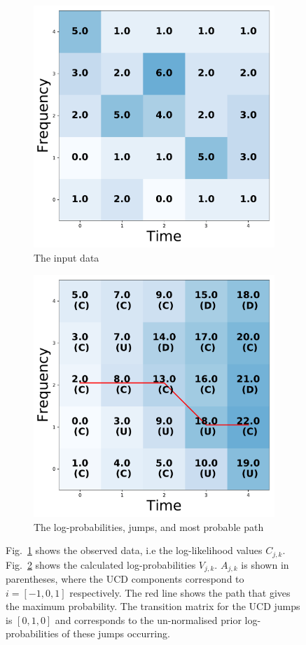 \begin{figure}
\centering
\begin{subfigure}[h]{0.8\columnwidth}
\includegraphics[width=0.8\columnwidth]{C3_soap/vit_data.pdf}
\caption{The input data}
\label{soap:plot:data}
\end{subfigure}

\begin{subfigure}[h]{0.8\columnwidth}
\includegraphics[width=0.8\columnwidth]{C3_soap/vit_prob.pdf}
\caption{The log-probabilities, jumps, and most probable path}
\label{soap:plot:likelihood}
\end{subfigure}

\caption[Simple example of how Viterbi algorithm works.]{ Fig.~\ref{soap:plot:data} shows
the observed data, i.e the log-likelihood values $C_{j,k}$. Fig.~\ref{soap:plot:likelihood} shows the calculated
log-probabilities $V_{j,k}$. $A_{j,k}$ is shown in parentheses, where the \gls{UCD}
components correspond to $i= [-1,0,1]$ respectively. The red line shows the
path that gives the maximum probability. The transition matrix for the \gls{UCD} jumps is $[0,1,0]$ and corresponds to the un-normalised prior
log-probabilities of these jumps occurring.}
\label{soap:plots}
\end{figure}

